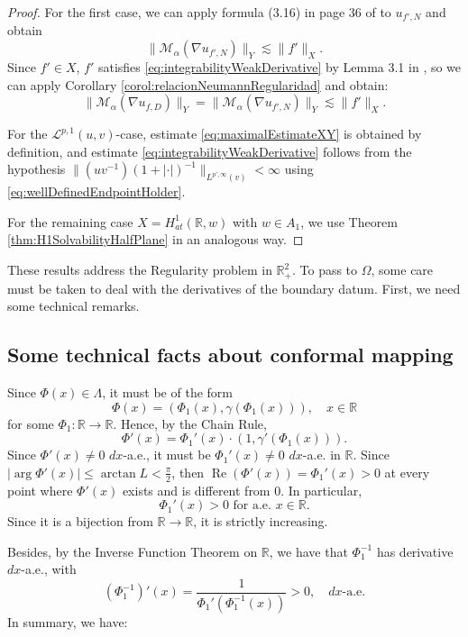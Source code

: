 \documentclass[12pt]{amsart}
\newcommand{\R}{\mathbb{R}}
\theoremstyle{plain}
\theoremstyle{definition}
\numberwithin{equation}{section}
\begin{document}
\begin{proof}
For the first case, we can apply formula (3.16) in page 36 of \cite{CNO} to $u_{f',N}$ and obtain
\begin{equation}\label{eq:maximalEstimateXY}
\|\mathcal{M}_{\alpha}(\nabla u_{f',N})\|_{Y}
\lesssim 
\|f'\|_{X}.    
\end{equation}
Since $f'\in X$, $f'$ satisfies \eqref{eq:integrabilityWeakDerivative} by Lemma 3.1 in \cite{CNO}, so we can apply Corollary \ref{corol:relacionNeumannRegularidad} and obtain:
\[
\|\mathcal{M}_{\alpha}(\nabla u_{f,D})\|_{Y}
=
\|\mathcal{M}_{\alpha}(\nabla u_{f',N})\|_{Y}
\lesssim 
\|f'\|_{X}.
\]

For the $\mathcal{L}^{p,1}(u,v)$-case, estimate \eqref{eq:maximalEstimateXY} is obtained by definition, and estimate \eqref{eq:integrabilityWeakDerivative} follows from the hypothesis $\|(uv^{-1})(1+|\cdot|)^{-1}\|_{L^{p',\infty}(v)}<\infty$ using \eqref{eq:wellDefinedEndpointHolder}.

For the remaining case $X=H_{at}^{1}(\R,w)$ with $w\in A_1$, we use Theorem \ref{thm:H1SolvabilityHalfPlane} in an analogous way. \qedhere
\end{proof}

These results address the Regularity problem in $\R_{+}^2$. To pass to $\Omega$, some care must be taken to deal with the derivatives of the boundary datum. First, we need some technical remarks.

\subsection{Some technical facts about conformal mapping}

Since $\Phi(x)\in\Lambda$, it must be of the form 
\[
\Phi(x)=(\Phi_1(x),\gamma(\Phi_1(x))),\quad x\in\R
\]
for some $\Phi_1\colon \R\to\R$. Hence, by the Chain Rule, 
\[
\Phi'(x)=\Phi_1'(x)\cdot (1,\gamma'(\Phi_1(x))).
\]
Since $\Phi'(x)\neq 0$ $dx$-a.e., it must be $\Phi_1'(x)\neq 0$ $dx$-a.e. in $\R$. Since $|\operatorname{arg}\Phi'(x)|\leq\arctan{L}<\frac{\pi}{2}$, then $\operatorname{Re}(\Phi'(x))=\Phi_1'(x)>0$ at every point where $\Phi'(x)$ exists and is different from $0$. In particular, 
\begin{equation}\label{eq:positiveDerivativePhi1}
\Phi_1'(x)>0 \text{ for a.e. } x\in\R. 
\end{equation}
Since it is a bijection from $\R\to\R$, it is strictly  increasing.
 
Besides, by the Inverse Function Theorem on $\R$, we have that $\Phi_1^{-1}$ has derivative $dx$-a.e., with
\begin{equation}\label{eq:derivativeInversePhi1}
(\Phi_1^{-1})'(x)
=
\frac{1}{\Phi_1'(\Phi_1^{-1}(x))}
>
0,\quad dx\text{-a.e.}    
\end{equation}
In summary, we have:
\end{document}
